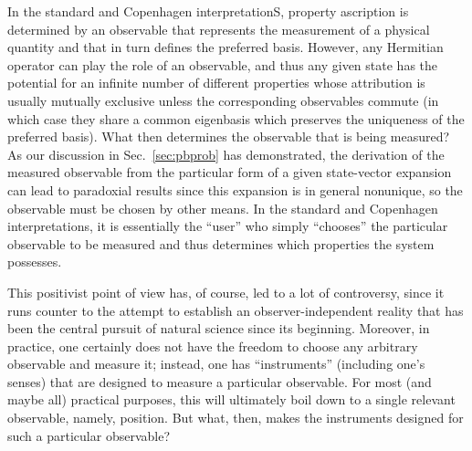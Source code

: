 \documentclass[rmp,aps,amsmath,amsfonts,noshowkeys,noshowpacs,12pt]{revtex4}
\begin{document}
In the standard and Copenhagen interpretationS, property ascription is
determined by an observable that represents the measurement of a
physical quantity and that in turn defines the preferred basis.
However, any Hermitian operator can play the role of an observable,
and thus any given state has the potential for an infinite number of
different properties whose attribution is usually mutually exclusive
unless the corresponding observables commute (in which case they share
a common eigenbasis which preserves the uniqueness of the preferred
basis). What then determines the observable that is being measured? As
our discussion in Sec.~\ref{sec:pbprob} has demonstrated, the
derivation of the measured observable from the particular form of a
given state-vector expansion can lead to paradoxial results since this
expansion is in general nonunique, so the observable must be chosen by
other means. In the standard and Copenhagen interpretations, it is
essentially the ``user'' who simply ``chooses'' the particular
observable to be measured and thus determines which properties the
system possesses.

This positivist point of view has, of course, led to a lot of
controversy, since it runs counter to the attempt to establish an
observer-independent reality that has been the central pursuit of
natural science since its beginning.  Moreover, in practice, one
certainly does not have the freedom to choose any arbitrary observable
and measure it; instead, one has ``instruments'' (including one's
senses) that are designed to measure a particular observable. For most
(and maybe all) practical purposes, this will ultimately boil down to
a single relevant observable, namely, position. But what, then, makes
the instruments designed for such a particular observable?
\end{document}
